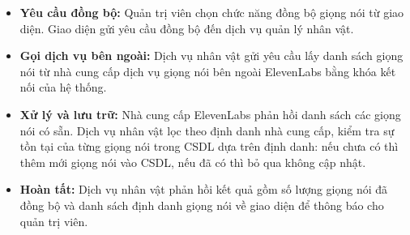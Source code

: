 \begin{itemize}

\item \textbf{Yêu cầu đồng bộ:}
Quản trị viên
chọn chức năng đồng bộ giọng nói từ giao diện.
Giao diện gửi yêu cầu đồng bộ đến dịch vụ quản lý nhân vật.

\item \textbf{Gọi dịch vụ bên ngoài:}
Dịch vụ nhân vật
gửi yêu cầu lấy danh sách giọng nói
từ nhà cung cấp dịch vụ giọng nói bên ngoài ElevenLabs bằng khóa kết nối của hệ thống.

\item \textbf{Xử lý và lưu trữ:}
Nhà cung cấp ElevenLabs phản hồi danh sách các giọng nói có sẵn.
Dịch vụ nhân vật lọc theo định danh nhà cung cấp, kiểm tra sự tồn tại của từng giọng nói
trong CSDL dựa trên định danh: nếu chưa có thì thêm mới giọng nói vào CSDL,
nếu đã có thì bỏ qua không cập nhật.

\item \textbf{Hoàn tất:}
Dịch vụ nhân vật phản hồi kết quả gồm số lượng giọng nói đã đồng bộ
và danh sách định danh giọng nói về giao diện để thông báo cho quản trị viên.

\end{itemize}
